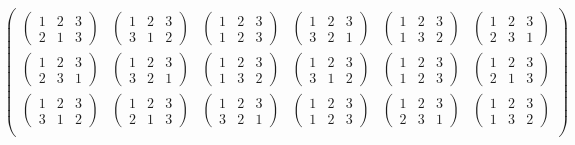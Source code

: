 \documentclass{article}
\begin{document}
\begin{siderules}
\[\begin{pmatrix}
\begin{pmatrix}1&2&3\\2&1&3\end{pmatrix}&\begin{pmatrix}1&2&3\\3&1&2\end{pmatrix}&\begin{pmatrix}1&2&3\\1&2&3\end{pmatrix}&\begin{pmatrix}1&2&3\\3&2&1\end{pmatrix}&\begin{pmatrix}1&2&3\\1&3&2\end{pmatrix}&\begin{pmatrix}1&2&3\\2&3&1\end{pmatrix}\\
\begin{pmatrix}1&2&3\\2&3&1\end{pmatrix}&\begin{pmatrix}1&2&3\\3&2&1\end{pmatrix}&\begin{pmatrix}1&2&3\\1&3&2\end{pmatrix}&\begin{pmatrix}1&2&3\\3&1&2\end{pmatrix}&\begin{pmatrix}1&2&3\\1&2&3\end{pmatrix}&\begin{pmatrix}1&2&3\\2&1&3\end{pmatrix}\\
\begin{pmatrix}1&2&3\\3&1&2\end{pmatrix}&\begin{pmatrix}1&2&3\\2&1&3\end{pmatrix}&\begin{pmatrix}1&2&3\\3&2&1\end{pmatrix}&\begin{pmatrix}1&2&3\\1&2&3\end{pmatrix}&\begin{pmatrix}1&2&3\\2&3&1\end{pmatrix}&\begin{pmatrix}1&2&3\\1&3&2\end{pmatrix}\\

\end{pmatrix}\]
\end{siderules}
\end{document}
